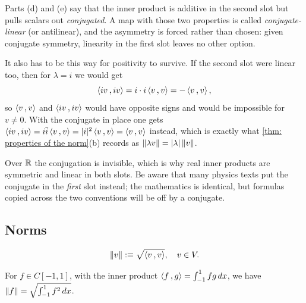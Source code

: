 \begin{ainote}
  Parts (d) and (e) say that the inner product is additive in the second slot but pulls scalars out \emph{conjugated}. A map with those two properties is called \emph{conjugate-linear} (or antilinear), and the asymmetry is forced rather than chosen: given conjugate symmetry, linearity in the first slot leaves no other option.

  It also has to be this way for positivity to survive. If the second slot were linear too, then for $\lambda = i$ we would get
  \begin{equation}
    \ip{iv}{iv} = i \cdot i \ip{v}{v} = -\ip{v}{v},
  \end{equation}
  so $\ip{v}{v}$ and $\ip{iv}{iv}$ would have opposite signs and  would be impossible for $v \neq 0$. With the conjugate in place one gets $\ip{iv}{iv} = i \overline{i} \ip{v}{v} = |i|^2 \ip{v}{v} = \ip{v}{v}$ instead, which is exactly what \ref{thm: properties of the norm}(b) records as $\left \lVert \lambda v \right \rVert = |\lambda| \left \lVert v \right \rVert$.

  Over $\mathbb{R}$ the conjugation is invisible, which is why real inner products are symmetric and linear in both slots. Be aware that many physics texts put the conjugate in the \emph{first} slot instead; the mathematics is identical, but formulas copied across the two conventions will be off by a conjugate.
\end{ainote}

\subsection{Norms}

\begin{mydef} [norm]
  \begin{equation}
    \norm{v} :\equiv \sqrt{\ip{v}{v}}, \quad v \in  V.
  \end{equation}
\end{mydef}

\begin{example}
  For $f \in C[-1,1]$, with the inner product $\ip{f}{g} = \int_{-1}^{1} f g \dx$, we have $\left \lVert f \right \rVert = \sqrt { \int_{-1}^{1} f^2 \, dx}$.

\end{example}

